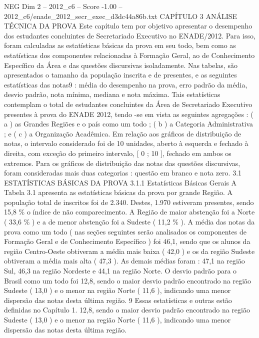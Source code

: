 \begin{textsample}{NEG Dim 2 – 2012\_c6 – Score -1.00 – 2012\_c6/enade\_2012\_secr\_exec\_d3dc44a86b.txt}  \label{ex:f2_neg_187}
CAPÍTULO 3 ANÁLISE TÉCNICA DA PROVA Este capítulo tem por objetivo apresentar o desempenho dos estudantes concluintes de Secretariado Executivo no ENADE/2012.
Para isso, foram calculadas as estatísticas básicas da prova em seu todo, bem como as estatísticas dos componentes relacionadas à Formação Geral, ao de Conhecimento Específico da Área e das questões discursivas isoladamente.
Nas tabelas, são apresentados o tamanho da população inscrita e de presentes, e as seguintes estatísticas das notas9 : média do desempenho na prova, erro padrão da média, desvio padrão, nota mínima, mediana e nota máxima.
Tais estatísticas contemplam o total de estudantes concluintes da Área de Secretariado Executivo presentes à prova do ENADE 2012, tendo -se em vista as seguintes agregações : ( a ) as Grandes Regiões e o país como um todo ; ( b ) a Categoria Administrativa ; e ( c ) a Organização Acadêmica.
Em relação aos gráficos de distribuição de notas, o intervalo considerado foi de 10 unidades, aberto à esquerda e fechado à direita, com exceção do primeiro intervalo, [ 0 ; 10 ], fechado em ambos os extremos.
Para os gráficos de distribuição das notas das questões discursivas, foram consideradas mais duas categorias : questão em branco e nota zero. 3.1 ESTATÍSTICAS BÁSICAS DA PROVA 3.1.1 Estatísticas Básicas Gerais A Tabela 3.1 apresenta as estatísticas básicas da prova por grande Região.
A população total de inscritos foi de 2.340.
Destes, 1.970 estiveram presentes, sendo 15,8 \% o índice de não comparecimento.
A Região de maior abstenção foi a Norte ( 33,6 \% ) e a de menor abstenção foi a Sudeste ( 11,2 \% ).
A média das notas da prova como um todo ( nas seções seguintes serão analisados os componentes de Formação Geral e de Conhecimento Específico ) foi 46,1, sendo que os alunos da região Centro-Oeste obtiveram a média mais baixa ( 42,0 ) e os da região Sudeste obtiveram a média mais alta ( 47,3 ).
As demais médias foram : 47,1 na região Sul, 46,3 na região Nordeste e 44,1 na região Norte.
O desvio padrão para o Brasil como um todo foi 12,8, sendo o maior desvio padrão encontrado na região Sudeste ( 13,0 ) e o menor na região Norte ( 11,6 ), indicando uma menor dispersão das notas desta última região. 9 Essas estatísticas e outras estão definidas no Capítulo 1. 12,8, sendo o maior desvio padrão encontrado na região Sudeste ( 13,0 ) e o menor na região Norte ( 11,6 ), indicando uma menor dispersão das notas desta última região.

\end{textsample}
